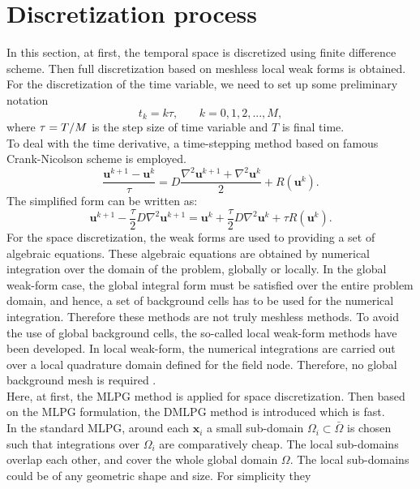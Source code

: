 \documentclass[12pt]{article}
\numberwithin{equation}{section}
\begin{document}
\section{Discretization process}
In this section, at first, the temporal space is discretized using finite difference scheme. Then full discretization based on meshless local weak forms is obtained.\\
For the discretization of the time variable,
we need to set up some preliminary notation \[{t_k} = k\tau ,\,\,\,\,\,\,\,\,\,\,\,k = 0,1,2,...,M,\]
where $\tau  = {T \mathord{\left/
 {\vphantom {T M}} \right.
 \kern-\nulldelimiterspace} M}$ is the step size of time variable and $T$ is final time.\\ To deal with the time derivative, a time-stepping method based on famous Crank-Nicolson scheme is employed.
\begin{equation}\frac{{{\mathbf{u}^{k + 1}} - {\mathbf{u}^k}}}{\tau } = D\frac{{{\nabla ^2}{\mathbf{u}^{k + 1}} + {\nabla ^2}{\mathbf{u}^k}}}{2} + R({\mathbf{u}^k}).\end{equation}
The simplified form can be written as:
\begin{equation}\label{Gzaman}
{\mathbf{u}^{k + 1}} - \frac{\tau }{2}D{\nabla ^2}{\mathbf{u}^{k + 1}} = {\mathbf{u}^k} + \frac{\tau }{2}D{\nabla ^2}{\mathbf{u}^k} + \tau R({\mathbf{u}^k}).\end{equation}
For the space discretization, the weak forms are used to providing a set of algebraic equations. These algebraic equations are obtained by numerical integration over the domain of the problem, globally or locally. In the global weak-form case, the global integral form must be satisfied over the entire problem
domain, and hence, a set of background cells has to be used for the
numerical integration. Therefore these methods are not truly
meshless methods.  To avoid the use of global background cells, the so-called local weak-form methods have been developed. In local weak-form, the numerical
integrations are carried out over a local quadrature domain defined for the field
node. Therefore, no global background mesh is required \cite{Liu}.\\
Here, at first, the MLPG method is applied for space discretization. Then based on the MLPG formulation, the DMLPG method is introduced which is fast.\\
In the standard MLPG, around each $\mathbf{x}_i$ a small sub-domain $\Omega _i \subset \bar \Omega $
is chosen such that integrations over  $\Omega _i$ are comparatively cheap. The local sub-domains overlap each other, and cover the whole global domain $\Omega$. The local sub-domains could be of any geometric shape and size.  For simplicity they
\end{document}
